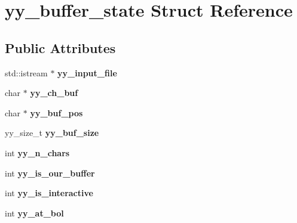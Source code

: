 \hypertarget{structyy__buffer__state}{
\section{yy\_\-buffer\_\-state Struct Reference}
\label{structyy__buffer__state}
}
\subsection*{Public Attributes}
\begin{DoxyCompactItemize}
\item 
\hypertarget{structyy__buffer__state_a3cea2f85a5c18fae4a8dd1ca44c3a977}{
std::istream $\ast$ {\bfseries yy\_\-input\_\-file}}
\label{structyy__buffer__state_a3cea2f85a5c18fae4a8dd1ca44c3a977}

\item 
\hypertarget{structyy__buffer__state_ad7b8df8d8a4688e57b0b8d3ca75adc85}{
char $\ast$ {\bfseries yy\_\-ch\_\-buf}}
\label{structyy__buffer__state_ad7b8df8d8a4688e57b0b8d3ca75adc85}

\item 
\hypertarget{structyy__buffer__state_a58aa927f098b99d99e75da80f9b681ef}{
char $\ast$ {\bfseries yy\_\-buf\_\-pos}}
\label{structyy__buffer__state_a58aa927f098b99d99e75da80f9b681ef}

\item 
\hypertarget{structyy__buffer__state_a48302f5f3477a9c78bbddf56d356ef54}{
yy\_\-size\_\-t {\bfseries yy\_\-buf\_\-size}}
\label{structyy__buffer__state_a48302f5f3477a9c78bbddf56d356ef54}

\item 
\hypertarget{structyy__buffer__state_a06406208824817acfec2183b79080945}{
int {\bfseries yy\_\-n\_\-chars}}
\label{structyy__buffer__state_a06406208824817acfec2183b79080945}

\item 
\hypertarget{structyy__buffer__state_a80ce2431c70dc4f89ced487f18449465}{
int {\bfseries yy\_\-is\_\-our\_\-buffer}}
\label{structyy__buffer__state_a80ce2431c70dc4f89ced487f18449465}

\item 
\hypertarget{structyy__buffer__state_abf5c70eea75581b58c0ee7bd31b14490}{
int {\bfseries yy\_\-is\_\-interactive}}
\label{structyy__buffer__state_abf5c70eea75581b58c0ee7bd31b14490}

\item 
\hypertarget{structyy__buffer__state_a9d60c60af6e1a6f69de16871fd64f85f}{
int {\bfseries yy\_\-at\_\-bol}}
\label{structyy__buffer__state_a9d60c60af6e1a6f69de16871fd64f85f}


\end{DoxyCompactItemize}
